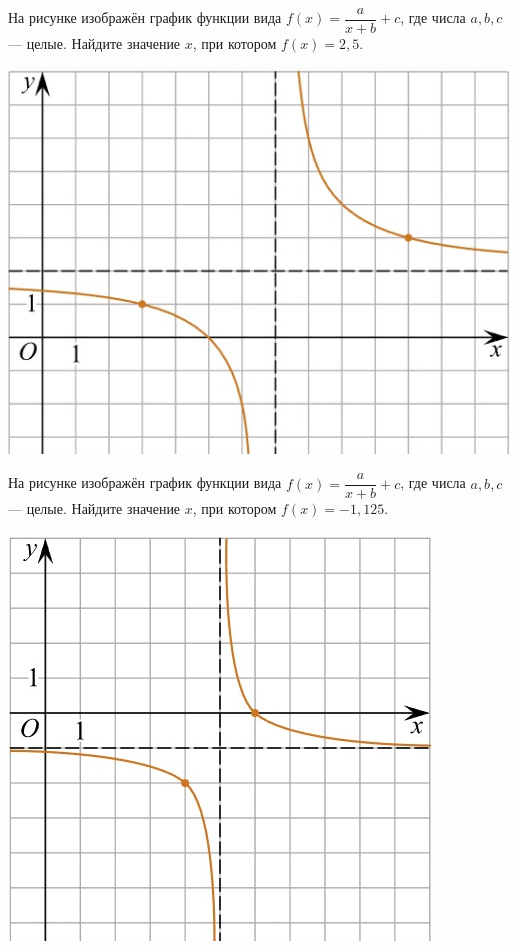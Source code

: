 \begin{class}[number=6]
\begin{listofex}
\begin{minipage}[c]{0.25\textwidth}
		\end{minipage}
		\item
		\begin{minipage}[t]{0.67\textwidth}
			На рисунке изображён график функции вида \(f(x)=\dfrac{a}{x+b}+c\), где числа \(a, b, c\) --- целые. Найдите значение \(x\), при котором \(f(x)=2,5\).
		\end{minipage}
		\begin{minipage}[c]{0.25\textwidth}
			\includegraphics[align=t, width=\textwidth]{pics/G101M4C6-3.jpg}
		\end{minipage}
		\item
		\begin{minipage}[t]{0.67\textwidth}
			На рисунке изображён график функции вида \(f(x)=\dfrac{a}{x+b}+c\), где числа \(a, b, c\) --- целые. Найдите значение \(x\), при котором \(f(x)=-1,125\).
		\end{minipage}
		\begin{minipage}[c]{0.25\textwidth}
			\includegraphics[align=t, width=\textwidth]{pics/G101M4C6-4.jpg}

\end{minipage}
\end{listofex}
\end{class}
